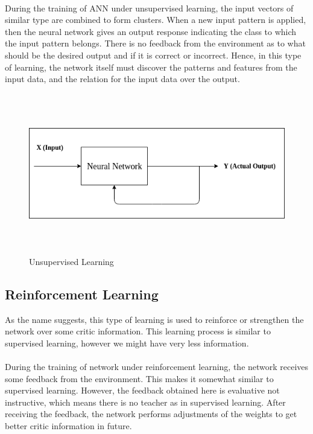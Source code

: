 \documentclass{report}
\begin{document}
\paragraph{}
During the training of ANN under unsupervised learning, the input vectors of similar type are combined to form clusters. When a new input pattern is applied, then the neural network gives an output response indicating the class to which the input pattern belongs.
There is no feedback from the environment as to what should be the desired output and if it is correct or incorrect. Hence, in this type of learning, the network itself must discover the patterns and features from the input data, and the relation for the input data over the output.

\begin{figure}[htbp]
\centering
\includegraphics[height=7cm,width = 16cm]{Pictures/Unsupervised_Learning.png}
\caption{Unsupervised Learning}
\label{}
\end{figure}

\subsection{Reinforcement Learning}

As the name suggests, this type of learning is used to reinforce or strengthen the network over some critic information. This learning process is similar to supervised learning, however we might have very less information.
\paragraph{}
During the training of network under reinforcement learning, the network receives some feedback from the environment. This makes it somewhat similar to supervised learning. However, the feedback obtained here is evaluative not instructive, which means there is no teacher as in supervised learning. After receiving the feedback, the network performs adjustments of the weights to get better critic information in future.
\end{document}
